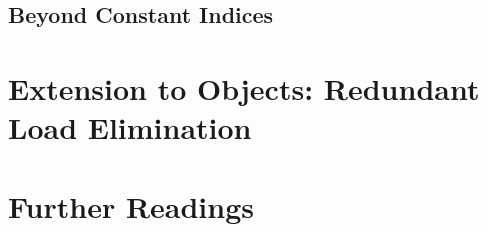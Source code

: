 \subsection{Beyond Constant Indices}
\label{sec:non-const}



\section{Extension to Objects: Redundant Load Elimination}
\label{sec:heap}


\section{Further Readings}
\label{sec:conclusions}

